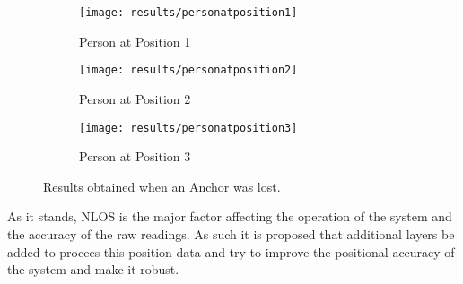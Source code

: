 \begin{figure}[h!]
    \centering
    \begin{subfigure}{0.45\textwidth}
            \texttt{[image: results/personatposition1]}
            \caption{Person at Position 1}
    \end{subfigure}
    \begin{subfigure}{0.45\textwidth}
            \texttt{[image: results/personatposition2]}
            \caption{Person at Position 2}
    \end{subfigure}
    \begin{subfigure}{0.45\textwidth}
            \texttt{[image: results/personatposition3]}
            \caption{Person at Position 3}
    \end{subfigure}
    \caption{Results obtained when an Anchor was lost.}
    \label{fig:persons}
\end{figure}
As it stands, NLOS is the major factor affecting the operation of the system and the accuracy of the raw readings.
As such it is proposed that additional layers be added to procees this position data and try to improve the positional accuracy of the system and make it robust.

